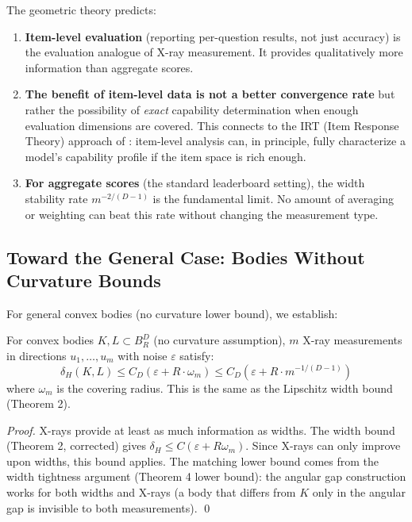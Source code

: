 The geometric theory predicts:
\begin{enumerate}
  \item \textbf{Item-level evaluation} (reporting per-question results, not just accuracy) is the evaluation analogue of X-ray measurement. It provides qualitatively more information than aggregate scores.
  
  \item \textbf{The benefit of item-level data is not a better convergence rate} but rather the possibility of \emph{exact} capability determination when enough evaluation dimensions are covered. This connects to the IRT (Item Response Theory) approach of \citet{polo2024tinybenchmarks}: item-level analysis can, in principle, fully characterize a model's capability profile if the item space is rich enough.
  
  \item \textbf{For aggregate scores} (the standard leaderboard setting), the width stability rate $m^{-2/(D-1)}$ is the fundamental limit. No amount of averaging or weighting can beat this rate without changing the measurement type.
\end{enumerate}


\subsection{Toward the General Case: Bodies Without Curvature Bounds}

For general convex bodies (no curvature lower bound), we establish:

\begin{proposition}
\label{prop:xray-general}
For convex bodies $K, L \subset B_R^D$ (no curvature assumption), $m$ X-ray measurements in directions $u_1, \ldots, u_m$ with noise $\varepsilon$ satisfy:
\[
  \delta_H(K, L) \leq C_D\!\left(\varepsilon + R \cdot \omega_m\right) \leq C_D\!\left(\varepsilon + R \cdot m^{-1/(D-1)}\right)
\]
where $\omega_m$ is the covering radius. This is the same as the Lipschitz width bound (Theorem 2).
\end{proposition}

\begin{proof}
X-rays provide at least as much information as widths. The width bound (Theorem 2, corrected) gives $\delta_H \leq C(\varepsilon + R\omega_m)$. Since X-rays can only improve upon widths, this bound applies. The matching lower bound comes from the width tightness argument (Theorem 4 lower bound): the angular gap construction works for both widths and X-rays (a body that differs from $K$ only in the angular gap is invisible to both measurements). \qed
\end{proof}

